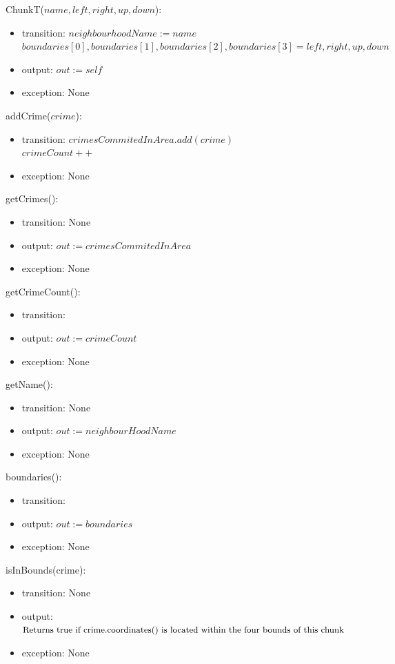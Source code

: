 \documentclass[12pt]{article}
\begin{document}
ChunkT($name, left, right, up, down$):
\begin{itemize}
\item transition: $neighbourhoodName := name$\\
$boundaries[0], boundaries[1], boundaries[2], boundaries[3] = left, right, up, down$
\item output: $\mathit{out} := \mathit{self}$
\item exception: None
\end{itemize}

\noindent addCrime($crime$):
\begin{itemize}
\item transition: $crimesCommitedInArea.add(crime)$\\$crimeCount++$
\item exception: None
\end{itemize}

\noindent getCrimes():
\begin{itemize}
\item transition: None
\item output: $out := crimesCommitedInArea$
\item exception: None
\end{itemize}

\noindent getCrimeCount():
\begin{itemize}
\item transition:
\item output: $out := crimeCount$
\item exception: None
\end{itemize}

\noindent getName():
\begin{itemize}
\item transition: None
\item output: $out := neighbourHoodName$
\item exception: None
\end{itemize}

\noindent boundaries():
\begin{itemize}
\item transition:
\item output: $out := boundaries$
\item exception: None
\end{itemize}

\noindent isInBounds(crime):
\begin{itemize}
\item transition: None
\item output: $\textnormal{\small{Returns true if crime.coordinates() is located within the four bounds of this chunk}}$
\item exception: None
\end{itemize}
\end{document}
